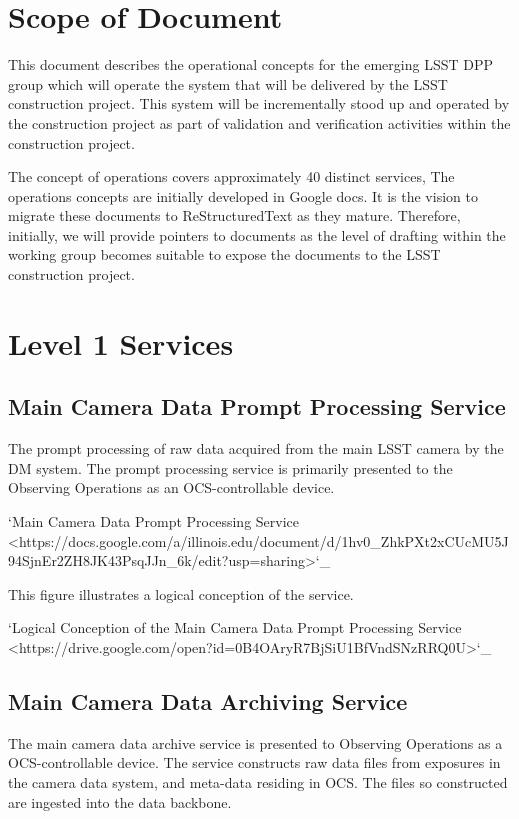 \section{Scope of Document}


This document describes the operational concepts for the emerging LSST DPP group which will operate
the system that will be delivered by the LSST construction project. This system will be incrementally
stood up and operated by the construction project as part of validation and verification activities
within the construction project.

The concept of operations covers approximately 40 distinct services, The operations concepts
are initially developed in Google docs. It is the vision to  migrate these documents to
ReStructuredText as they mature.  Therefore, initially, we will provide pointers to documents as
the level of drafting within the working group becomes suitable to expose the documents to the
LSST construction project.


\section{ Level 1 Services}

\subsection{Main Camera Data Prompt Processing Service}

The prompt processing of raw data acquired from the main LSST camera
by the DM system. The prompt processing service is primarily presented
to the Observing Operations as an OCS-controllable device.

`Main Camera Data Prompt Processing Service  <https://docs.google.com/a/illinois.edu/document/d/1hv0_ZhkPXt2xCUcMU5J94SjnEr2ZH8JK43PsqJJn_6k/edit?usp=sharing>`_

This figure illustrates a logical conception of the service.

`Logical Conception of the Main Camera Data Prompt Processing Service  <https://drive.google.com/open?id=0B4OAryR7BjSiU1BfVndSNzRRQ0U>`_



\subsection{Main Camera Data Archiving Service}

The main camera data archive service is presented to Observing
Operations as a OCS-controllable device.  The service constructs raw
data files from exposures in the camera data system, and meta-data
residing in OCS.  The files so constructed are ingested into the data
backbone.

